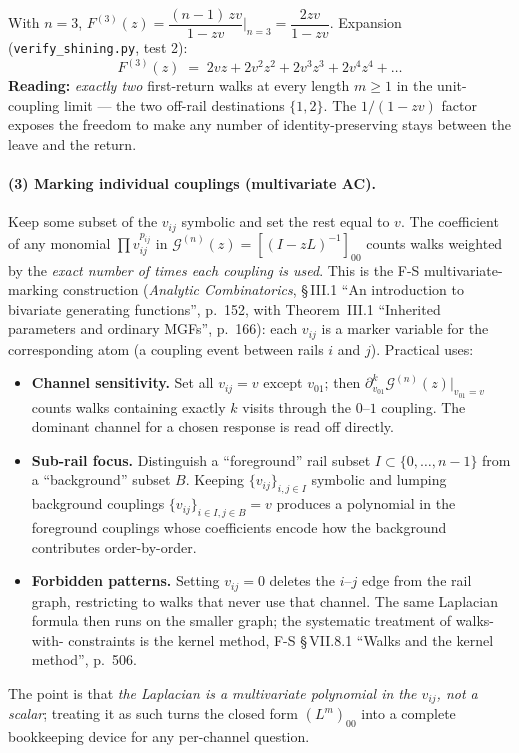 \documentclass[11pt,a4paper]{article}
\begin{document}
\begin{examplebox}[title={Example (2$'$)\;\;First-return GF at $n{=}3$}]
With $n{=}3$,
$F^{(3)}(z) = \dfrac{(n{-}1)\,zv}{1-zv}\bigg|_{n=3} = \dfrac{2zv}{1-zv}$.
Expansion (\texttt{verify\_shining.py}, test 2):
\[
F^{(3)}(z) \;=\; 2vz + 2v^{2}z^{2} + 2v^{3}z^{3} + 2v^{4}z^{4} + \dots
\]
\textbf{Reading:} \emph{exactly two} first-return walks at every length
$m\geq 1$ in the unit-coupling limit --- the two off-rail destinations
$\{1,2\}$. The $1/(1-zv)$ factor exposes the freedom to make any number
of identity-preserving stays between the leave and the return.
\end{examplebox}

\paragraph{(3) Marking individual couplings (multivariate AC).}
Keep some subset of the $v_{ij}$ symbolic and set the rest equal to $v$.
The coefficient of any monomial $\prod v_{ij}^{p_{ij}}$ in
$\mathcal G^{(n)}(z) = [(I - zL)^{-1}]_{00}$ counts walks weighted by the
\emph{exact number of times each coupling is used}. This is the F-S
multivariate-marking construction (\emph{Analytic Combinatorics},
\S\,III.1 ``An introduction to bivariate generating functions'',
p.~152, with Theorem~III.1 ``Inherited parameters and ordinary MGFs'',
p.~166): each $v_{ij}$ is a marker variable for the corresponding atom
(a coupling event between rails $i$ and $j$). Practical uses:
\begin{itemize}[leftmargin=2em,itemsep=2pt]
  \item \textbf{Channel sensitivity.} Set all $v_{ij}=v$ except $v_{01}$;
        then $\partial_{v_{01}}^{k}\mathcal G^{(n)}(z)\big|_{v_{01}=v}$
        counts walks containing exactly $k$ visits through the $0$--$1$
        coupling. The dominant channel for a chosen response is read
        off directly.
  \item \textbf{Sub-rail focus.} Distinguish a ``foreground'' rail
        subset $I\subset\{0,\dots,n-1\}$ from a ``background'' subset
        $B$. Keeping $\{v_{ij}\}_{i,j\in I}$ symbolic and lumping
        background couplings $\{v_{ij}\}_{i\in I,j\in B}=v$ produces a
        polynomial in the foreground couplings whose coefficients
        encode how the background contributes order-by-order.
  \item \textbf{Forbidden patterns.} Setting $v_{ij}{=}0$ deletes the
        $i$--$j$ edge from the rail graph, restricting to walks that
        never use that channel. The same Laplacian formula then runs on
        the smaller graph; the systematic treatment of walks-with-
        constraints is the kernel method, F-S \S\,VII.8.1
        ``Walks and the kernel method'', p.~506.
\end{itemize}
The point is that \emph{the Laplacian is a multivariate polynomial in
the $v_{ij}$, not a scalar}; treating it as such turns the closed form
$(L^m)_{00}$ into a complete bookkeeping device for any per-channel
question.
\end{document}
